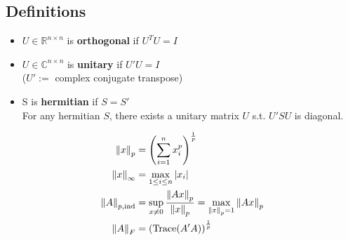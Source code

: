 \subsection{Definitions}
    \begin{itemize}
        \item $U \in \mathbb{R}^{n \times n}$ is \textbf{orthogonal} if $U^TU = I$
        \item $U \in \mathbb{C}^{n \times n}$ is \textbf{unitary} if $U'U = I$\\ ($U' :=$ complex conjugate transpose)
        \item S is \textbf{hermitian} if $S=S'$\\ For any hermitian $S$, there exists a unitary matrix $U$ s.t. $U'SU$ is diagonal.
    \end{itemize}
    \vspace*{-1em}
    \begin{align*}
        \left\| x \right\|_p &= \left(\sum_{i=1}^{n}x_i^p\right)^{\frac{1}{p}}\\
        \left\| x \right\|_\infty &= \max_{1\leq i\leq n} \left\lvert x_i \right\rvert\\
        \left\| A \right\|_{p,\text{ind}} &= \sup_{x \neq 0} \frac{\left\| Ax \right\|_p}{\left\| x \right\|_p} = \max_{\left\| x \right\|_p = 1} \left\| Ax \right\|_p\\
        \left\| A \right\|_F &= \left( \textrm{Trace}(A'A) \right)^{\frac{1}{p}}
    \end{align*}